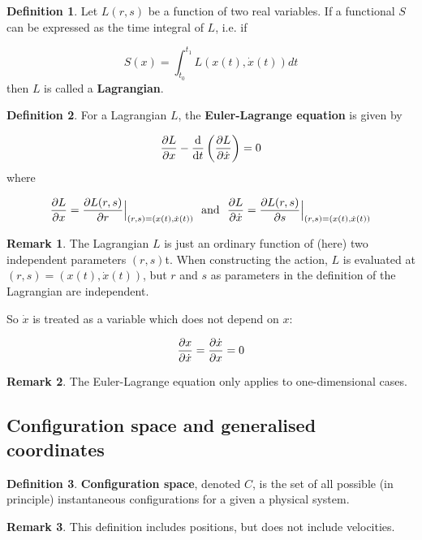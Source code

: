 \documentclass[12pt,a4paper]{article}
\theoremstyle{definition}
\newtheorem{definition}{Definition}[subsection]
\newtheorem*{remark}{Remark}
\begin{document}
\begin{definition}
	Let $L(r, s)$ be a function of two real variables. If a functional $S$ can be expressed as the time integral of $L$, i.e. if

	\[ S(x) = \int_{t_0}^{t_1} L(x(t), \dot{x}(t)) dt \]
	then $L$ is called a \textbf{Lagrangian}.
\end{definition}

\begin{definition}
	For a Lagrangian $L$, the \textbf{Euler-Lagrange equation} is given by

	\[ \diffp{L}{x} - \diff{}{t} \left( \diffp{L}{\dot{x}} \right) = 0 \]
	where

	\[ \diffp{L}{x} = \diffp{L(r, s)}{r} \Big|_{(r, s) = (x(t), \dot{x}(t))} \text{ \ and \ } \diffp{L}{\dot{x}} = \diffp{L(r, s)}{s} \Big|_{(r, s) = (x(t), \dot{x}(t))} \]
\end{definition}

\begin{remark}\label{rem:lagrangianParametersIndependent}
	The Lagrangian $L$ is just an ordinary function of (here) two independent parameters $(r, s)$t. When constructing the action, $L$ is evaluated at $(r, s) = (x(t), \dot{x}(t))$, but $r$ and $s$ as parameters in the definition of the Lagrangian are independent.

	So $\dot{x}$ is treated as a variable which does not depend on $x$:

	\[ \diffp{x}{\dot{x}} = \diffp{\dot{x}}{x} = 0 \]
\end{remark}

\begin{remark}
	The Euler-Lagrange equation only applies to one-dimensional cases.
\end{remark}

\subsection{Configuration space and generalised coordinates}

\begin{definition}
	\textbf{Configuration space}, denoted $C$, is the set of all possible (in principle) instantaneous configurations for a given a physical system.
\end{definition}

\begin{remark}
	This definition includes positions, but does not include velocities.
\end{remark}
\end{document}

